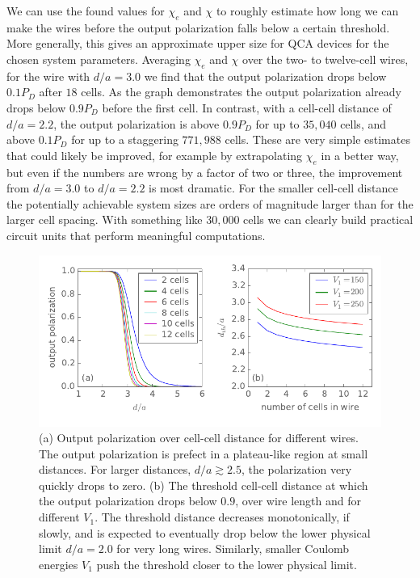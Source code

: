 We can use the found values for $\chi_e$ and $\chi$ to roughly estimate how long
we can make the wires before the output polarization falls below a certain
threshold. More generally, this gives an approximate upper size for QCA devices
for the chosen system parameters. Averaging $\chi_e$ and $\chi$ over the two- to
twelve-cell wires, for the wire with $d/a = 3.0$ we find that the output
polarization drops below $0.1 P_D$ after $18$ cells. As the graph demonstrates the
output polarization already drops below $0.9 P_D$ before the first cell. In
contrast, with a cell-cell distance of $d/a = 2.2$, the output polarization is
above $0.9 P_D$ for up to $35,040$ cells, and above $0.1 P_D$ for up to a
staggering $771,988$ cells. These are very simple estimates that could likely be
improved, for example by extrapolating $\chi_e$ in a better way, but even if the
numbers are wrong by a factor of two or three, the improvement from $d/a = 3.0$
to $d/a = 2.2$ is most dramatic. For the smaller cell-cell distance the
potentially achievable system sizes are orders of magnitude larger than for the
larger cell spacing. With something like $30,000$ cells we can clearly build
practical circuit units that perform meaningful computations.

\begin{figure}
  \center
  \includegraphics{cell_cell_distance_threshold}
  \caption{
  (a) Output polarization over cell-cell distance for different wires. The
  output polarization is prefect in a plateau-like region at small distances.
  For larger distances, $d/a \gtrsim 2.5$, the polarization very quickly drops
  to zero.
  (b) The threshold cell-cell distance at which the output polarization drops
  below $0.9$, over wire length and for different $V_1$. The threshold distance
  decreases monotonically, if slowly, and is expected to eventually drop below
  the lower physical limit $d/a = 2.0$ for very long wires. Similarly, smaller
  Coulomb energies $V_1$ push the threshold closer to the lower physical limit.
  }
  \label{fig:cell_cell_distance_threshold}
\end{figure}

